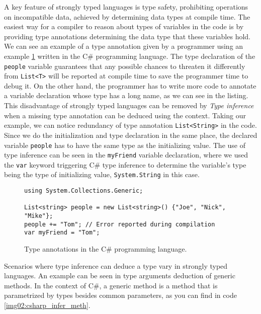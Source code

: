A key feature of strongly typed languages is type safety, prohibiting operations on incompatible data, achieved by determining data types at compile time. 
The easiest way for a compiler to reason about types of variables in the code is by providing type annotations determining the data type that these variables hold. 
We can see an example of a type annotation given by a programmer using an example \ref{img01:csharp_type_anot} written in the C\# programming language. 
The type declaration of the \texttt{people} variable guarantees that any possible chances to threaten it differently from \texttt{List<T>} will be reported at compile time to save the programmer time to debug it. 
On the other hand, the programmer has to write more code to annotate a variable declaration whose type has a long name, as we can see in the listing. 
This disadvantage of strongly typed languages can be removed by {\it Type inference} when a missing type annotation can be deduced using the context. 
Taking our example, we can notice redundancy of type annotation \texttt{List<String>} in the code. Since we do the initialization and type declaration in the same place, the declared variable \texttt{people} has to have the same type as the initializing value. 
The use of type inference can be seen in the \texttt{myFriend} variable declaration, where we used the \texttt{var} keyword triggering C\# type inference to determine the variable's type being the type of initializing value, \texttt{System.String} in this case.
\par
\begin{figure}
\begin{lstlisting}[style=csharp]
using System.Collections.Generic;

List<string> people = new List<string>() {"Joe", "Nick", "Mike"};
people += "Tom"; // Error reported during compilation
var myFriend = "Tom";
\end{lstlisting}
\caption{Type annotations in the C\# programming language.}
\label{img01:csharp_type_anot}
\end{figure}
\par
{}
Scenarios where type inference can deduce a type vary in strongly typed languages. 
An example can be seen in type arguments deduction of generic methods. 
In the context of C\#, a generic method is a method that is parametrized by types besides common parameters, as you can find in code \ref{img02:csharp_infer_meth}. 
